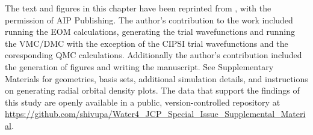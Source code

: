 The text and figures in this chapter have been reprinted from , with the permission of AIP Publishing.
The author's contribution to the work included running the EOM calculations, generating the trial wavefunctions and running the VMC/DMC with the exception of the CIPSI trial wavefunctions and the coresponding QMC calculations. Additionally the author's contribution included the generation of figures and writing the manuscript.
See Supplementary Materials for geometries, basis sets, additional simulation details, and instructions on generating radial orbital density plots.
The data that support the findings of this study are openly available in a public, version-controlled repository at \url{https://github.com/shivupa/Water4_JCP_Special_Issue_Supplemental_Material}.
